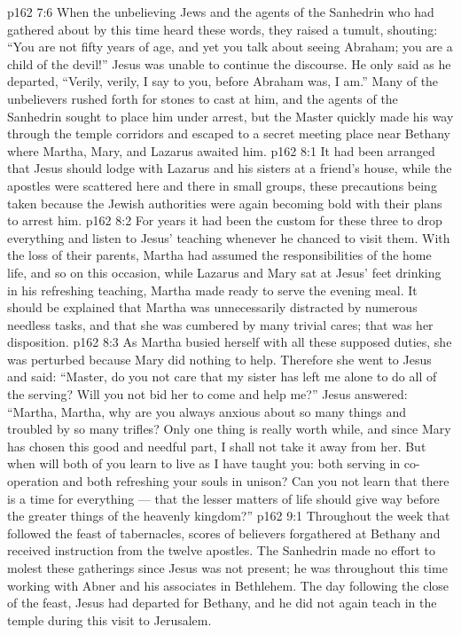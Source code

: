 \vs p162 7:6 \pc When the unbelieving Jews and the agents of the Sanhedrin who had gathered about by this time heard these words, they raised a tumult, shouting: “You are not fifty years of age, and yet you talk about seeing Abraham; you are a child of the devil!” Jesus was unable to continue the discourse. He only said as he departed, \textcolor{ubdarkred}{“Verily, verily, I say to you, before Abraham was, I am.”} Many of the unbelievers rushed forth for stones to cast at him, and the agents of the Sanhedrin sought to place him under arrest, but the Master quickly made his way through the temple corridors and escaped to a secret meeting place near Bethany where Martha, Mary, and Lazarus awaited him.
\vs p162 8:1 It had been arranged that Jesus should lodge with Lazarus and his sisters at a friend’s house, while the apostles were scattered here and there in small groups, these precautions being taken because the Jewish authorities were again becoming bold with their plans to arrest him.
\vs p162 8:2 For years it had been the custom for these three to drop everything and listen to Jesus’ teaching whenever he chanced to visit them. With the loss of their parents, Martha had assumed the responsibilities of the home life, and so on this occasion, while Lazarus and Mary sat at Jesus’ feet drinking in his refreshing teaching, Martha made ready to serve the evening meal. It should be explained that Martha was unnecessarily distracted by numerous needless tasks, and that she was cumbered by many trivial cares; that was her disposition.
\vs p162 8:3 As Martha busied herself with all these supposed duties, she was perturbed because Mary did nothing to help. Therefore she went to Jesus and said: “Master, do you not care that my sister has left me alone to do all of the serving? Will you not bid her to come and help me?” Jesus answered: \textcolor{ubdarkred}{“Martha, Martha, why are you always anxious about so many things and troubled by so many trifles? Only one thing is really worth while, and since Mary has chosen this good and needful part, I shall not take it away from her. But when will both of you learn to live as I have taught you: both serving in co\hyp{}operation and both refreshing your souls in unison? Can you not learn that there is a time for everything --- that the lesser matters of life should give way before the greater things of the heavenly kingdom?”}
\vs p162 9:1 Throughout the week that followed the feast of tabernacles, scores of believers forgathered at Bethany and received instruction from the twelve apostles. The Sanhedrin made no effort to molest these gatherings since Jesus was not present; he was throughout this time working with Abner and his associates in Bethlehem. The day following the close of the feast, Jesus had departed for Bethany, and he did not again teach in the temple during this visit to Jerusalem.
